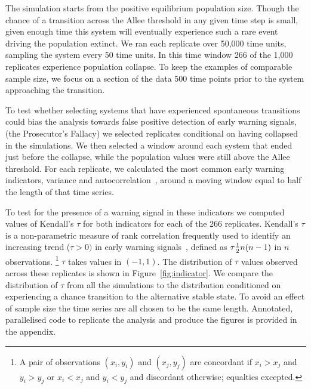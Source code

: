\documentclass[authoryear,review,12pt]{elsarticle}
\begin{document}
The simulation starts from the positive equilibrium population size.
Though the chance of a transition across the Allee threshold in any
given time step is small, given enough time this system will eventually
experience such a rare event driving the population extinct.  We ran
each replicate over 50,000 time units, sampling the system every 50
time units.  In this time window 266 of the 1,000 replicates experience
population collapse.  To keep the examples of comparable sample size,
we focus on a section of the data 500 time points prior to the system
approaching the transition.

To test whether selecting systems that have experienced
spontaneous transitions could bias the analysis towards false
positive detection of early warning signals, (the Prosecutor's
Fallacy) we selected replicates conditional on having collapsed
in the simulations.  We then selected a window around each system
that ended just before the collapse, while the population values
were still above the Allee threshold.  For each replicate, we
calculated the most common early warning indicators, variance and
autocorrelation~\citep[\emph{e.g.}][]{Carpenter2006,Dakos2008,Scheffer2009},
around a moving window equal to half the length of that time series.


To test for the presence of a warning signal in these indicators we
computed values of Kendall's $\tau$ for both indicators for each of
the 266 replicates.  Kendall's $\tau$ is a non-parametric measure of rank correlation frequently used to identify an increasing trend ($\tau > 0 )$ in early warning signals~\citep{Dakos2008, Dakos2011}, defined as $\tau \def \tfrac{(\text{number of concordant pairs}) - (\text{number of discordant pairs})}{\frac{1}{2} n (n-1) }$ in $n$ observations.  \footnote{A pair of observations $(x_i,y_i)$ and $(x_j, y_j)$ are concordant if $x_i > x_j$ and $y_i > y_j$ or $x_i < x_j$ and $y_i < y_j$ and discordant otherwise; equalties excepted.}  $\tau$ takes values in $(-1, 1)$.  The distribution
of $\tau$ values observed across these replicates is shown in
Figure~\ref{fig:indicator}.   
We compare the distribution of $\tau$ from all the simulations to
the distribution conditioned on experiencing a chance transition to the
alternative stable state.  To avoid an effect of sample size the time series are all chosen
to be the same length.  
Annotated, parallelised code to replicate the analysis
and produce the figures is provided in the appendix. 
\end{document}
